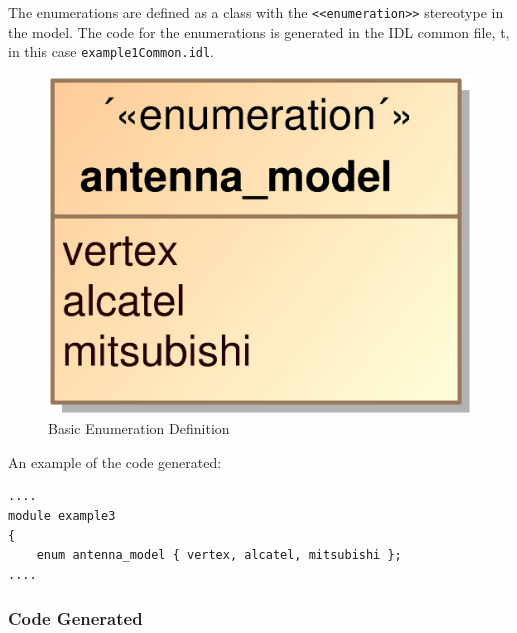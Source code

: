 The enumerations are defined as a class with the  \verb+<<enumeration>>+
stereotype in the model. The code for the enumerations is generated in the IDL
common file, t, in this case \verb+example1Common.idl+.

\begin{figure}[h!t]
\begin{center}
\includegraphics[scale=0.2]{images/enumeration}
\caption{\label{fig:vs_diag}Basic Enumeration Definition}
\end{center}
\end{figure} 

An example of the code generated:

\begin{center}
\begin{verbatim}
....
module example3
{
    enum antenna_model { vertex, alcatel, mitsubishi };
....
\end{verbatim}
\end{center}

\subsubsection{Code Generated}

